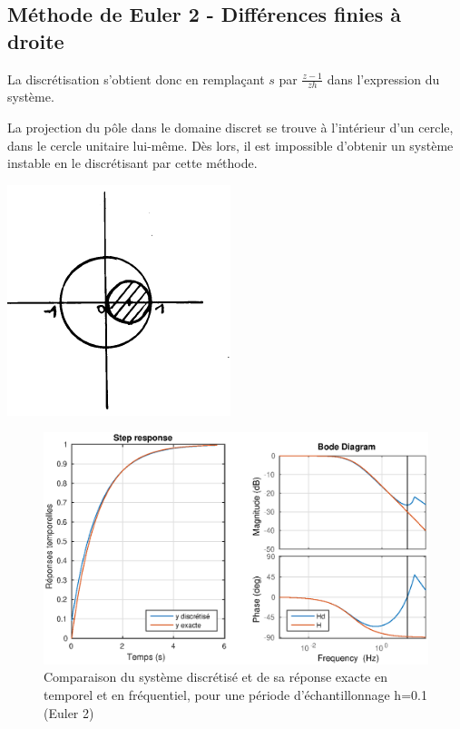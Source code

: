 \newpage
\subsection{Méthode de Euler 2 - Différences finies à droite}

La discrétisation s'obtient donc en remplaçant $s$ par $\frac{z-1}{zh}$ dans l'expression du système.

\begin{minipage}[b]{0.65\textwidth}
   La projection du pôle dans le domaine discret se trouve à l'intérieur d'un cercle, dans le cercle unitaire lui-même. Dès lors, il est impossible d'obtenir un système instable en le discrétisant par cette méthode.
\end{minipage}\hfill
\begin{minipage}[c]{0.3\textwidth}
  \includegraphics[scale=.6]{images/labo1-dom-droite} 
\end{minipage}

\begin{figure}[!h]
\center\includegraphics[width=1\linewidth]{eps/labo1-droite-step}
\caption{Comparaison du système discrétisé et de sa réponse exacte en temporel et en fréquentiel, pour une période d'échantillonnage h=0.1 (Euler 2)}
\label{labo1-droite-step}
\end{figure}


